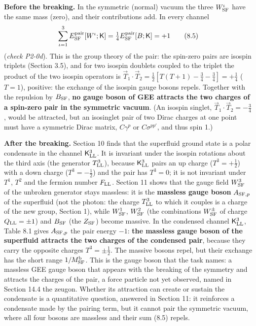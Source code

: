 \documentclass[
  10pt,
]{article}
\begin{document}
\textbf{Before the breaking.} In the symmetric (normal) vacuum the three
\(W^\iota_{\rm SF}\) have the same mass (zero), and their contributions
add. In every channel
\[\sum_{\iota=1}^3E^{\rm pair}_{\rm SF}[W^\iota;\mathsf K]=\tfrac14E^{\rm pair}_{\rm SF}[B;\mathsf K]=+1\tag{8.5}\]
(\emph{check P2-0d}). This is the group theory of the pair: the
spin-zero pairs are isospin triplets (Section 3.5), and for two isospin
doublets coupled to the triplet the product of the two isospin operators
is
\(\vec T_1\cdot\vec T_2=\tfrac12[T(T+1)-\tfrac34-\tfrac34]=+\tfrac14\)
(\(T=1\)), positive: the exchange of the isospin gauge bosons repels.
Together with the repulsion by \(B_{\rm SF}\), \textbf{no gauge boson of
GEE attracts the two charges of a spin-zero pair in the symmetric
vacuum}. (An isospin singlet, \(\vec T_1\cdot\vec T_2=-\tfrac34\), would
be attracted, but an isosinglet pair of two Dirac charges at one point
must have a symmetric Dirac matrix, \(C\gamma^p\) or \(C\sigma^{pp'}\),
and thus spin 1.)

\textbf{After the breaking.} Section 10 finds that the superfluid ground
state is a polar condensate in the channel \(\mathsf K^3_{\rm LL}\). It
is invariant under the isospin rotations about the third axis (the
generator \(T^3_{\rm LL}\)), because \(\mathsf K^3_{\rm LL}\) pairs an
up charge (\(T^3=+\tfrac12\)) with a down charge (\(T^3=-\tfrac12\)) and
the pair has \(T^3=0\); it is not invariant under \(T^1\), \(T^2\) and
the fermion number \(F_{\rm LL}\). Section 11 shows that the gauge field
\(W^3_{\rm SF}\) of the unbroken generator stays massless: it is the
\textbf{massless gauge boson} \(A_{{\rm SF},p}\) of the superfluid (not
the photon: the charge \(T^3_{\rm LL}\) to which it couples is a charge
of the new group, Section 1), while \(W^1_{\rm SF}\), \(W^2_{\rm SF}\)
(the combinations \(W^\pm_{\rm SF}\) of charge \(Q_{\rm LL}=\pm1\)) and
\(B_{\rm SF}\) (the \(Z_{\rm SF}\)) become massive. In the condensed
channel \(\mathsf K^3_{\rm LL}\), Table 8.1 gives \(A_{{\rm SF},p}\) the
pair energy \(-1\): \textbf{the massless gauge boson of the superfluid
attracts the two charges of the condensed pair}, because they carry the
opposite charges \(T^3=\pm\tfrac12\). The massive bosons repel, but
their exchange has the short range \(1/M^{\rm b}_{\rm SF}\). This is the
gauge boson that the task names: a massless GEE gauge boson that appears
with the breaking of the symmetry and attracts the charges of the pair,
a force particle not yet observed, named in Section 14.4 the zeugon.
Whether its attraction can create or sustain the condensate is a
quantitative question, answered in Section 11: it reinforces a
condensate made by the pairing term, but it cannot pair the symmetric
vacuum, where all four bosons are massless and their sum (8.5) repels.
\end{document}
